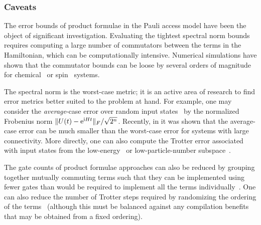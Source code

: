 \begin{refsection}

\subsubsection*{Caveats}
The error bounds of product formulae in the Pauli access model have been the object of significant investigation. Evaluating the tightest spectral norm bounds requires computing a large number of commutators between the terms in the Hamiltonian, which can be computationally intensive. Numerical simulations have shown that the commutator bounds can be loose by several orders of magnitude for chemical~\cite{babbush2015ChemicalBasisTrotter, poulin2014TrotterStepSize} or spin~\cite{childs2018towardsFirstQSimSpeedup} systems.

The spectral norm is the worst-case metric; it is an active area of research to find error metrics better suited to the problem at hand. For example, one may consider the \textit{average}-case error over random input states~\cite{chen2021conTrotter,Zhao2021HamiltonianSW} by the normalized Frobenius norm $\lVert U(t) - \mathrm{e}^{\mathrm{i} H t}\rVert_{F}/\sqrt{2^n}$. Recently, in \cite{chen2021conTrotter} it was shown that the average-case error can be much smaller than the worst-case error for systems with large connectivity. More directly, one can also compute the Trotter error associated with input states from the low-energy~\cite{Sahinoglu2021Hamiltonian} or low-particle-number subspace~\cite{tong2021ProvablyAccurateGaugeTheoryBosonicSystems, su2021NearlyTightTrottInerElect}.

The gate counts of product formulae approaches can also be reduced by grouping together mutually commuting terms such that they can be implemented using fewer gates than would be required to implement all the terms individually~\cite{vandenBerg2020circuitoptimization, Kivlichan2020ImprovedFaultTolerantSimulationCondensedMatter, CampbellHubbard22}. One can also reduce the number of Trotter steps required by randomizing the ordering of the terms~\cite{Childs2019RandomizedTrotter, cho2022doublingproductformularandom,poulin2011TimeDepTrotterRandomized} (although this must be balanced against any compilation benefits that may be obtained from a fixed ordering). 






\end{refsection}
